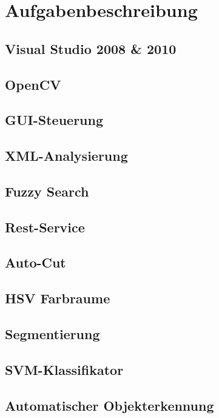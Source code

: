 \documentclass[12pt,a4paper]{report}
\begin{document}
\section{Aufgabenbeschreibung}

\subsection{Visual Studio 2008 \& 2010}

\subsection{OpenCV}

\subsection{GUI-Steuerung}

\subsection{XML-Analysierung}

\subsection{Fuzzy Search}

\subsection{Rest-Service}

\subsection{Auto-Cut}

\subsection{HSV Farbraume}

\subsection{Segmentierung}

\subsection{SVM-Klassifikator}

\subsection{Automatischer Objekterkennung}
\end{document}
